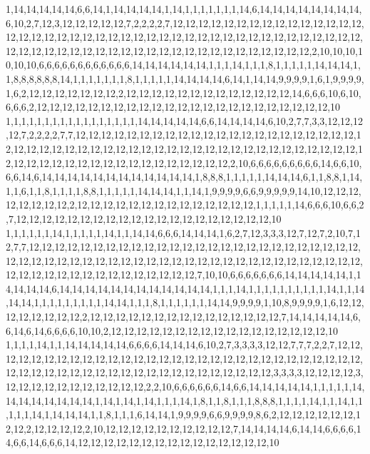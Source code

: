 1,14,14,14,14,14,6,6,14,1,14,14,14,14,1,14,1,1,1,1,1,1,1,14,6,14,14,14,14,14,14,14,14,6,10,2,7,12,3,12,12,12,12,12,7,2,2,2,2,7,12,12,12,12,12,12,12,12,12,12,12,12,12,12,12,12,12,12,12,12,12,12,12,12,12,12,12,12,12,12,12,12,12,12,12,12,12,12,12,12,12,12,12,12,12,12,12,12,12,12,12,12,12,12,12,12,12,12,12,12,12,12,12,12,12,12,12,2,10,10,10,10,10,10,6,6,6,6,6,6,6,6,6,6,6,6,14,14,14,14,14,14,1,1,1,14,1,1,1,8,1,1,1,1,1,14,14,14,1,1,8,8,8,8,8,8,14,1,1,1,1,1,1,1,8,1,1,1,1,1,14,14,14,14,6,14,1,14,14,9,9,9,9,1,6,1,9,9,9,9,1,6,2,12,12,12,12,12,12,12,2,12,12,12,12,12,12,12,12,12,12,12,12,12,14,6,6,6,10,6,10,6,6,6,2,12,12,12,12,12,12,12,12,12,12,12,12,12,12,12,12,12,12,12,12,12,12,12,10
1,1,1,1,1,1,1,1,1,1,1,1,1,1,1,1,1,14,14,14,14,14,6,6,14,14,14,14,6,10,2,7,7,3,3,12,12,12,12,7,2,2,2,2,7,7,12,12,12,12,12,12,12,12,12,12,12,12,12,12,12,12,12,12,12,12,12,12,12,12,12,12,12,12,12,12,12,12,12,12,12,12,12,12,12,12,12,12,12,12,12,12,12,12,12,12,12,12,12,12,12,12,12,12,12,12,12,12,12,12,12,12,12,12,2,10,6,6,6,6,6,6,6,6,6,14,6,6,10,6,6,14,6,14,14,14,14,14,14,14,14,14,14,14,14,1,8,8,8,1,1,1,1,1,14,14,14,6,1,1,8,8,1,14,1,1,6,1,1,8,1,1,1,1,8,8,1,1,1,1,1,14,14,14,1,1,14,1,9,9,9,9,6,6,9,9,9,9,9,14,10,12,12,12,12,12,12,12,12,2,12,12,12,12,12,12,12,12,12,12,12,12,12,12,1,1,1,1,1,14,6,6,6,10,6,6,2,7,12,12,12,12,12,12,12,12,12,12,12,12,12,12,12,12,12,12,12,12,10
1,1,1,1,1,1,14,1,1,1,1,1,14,1,1,14,14,6,6,6,14,14,14,1,6,2,7,12,3,3,3,12,7,12,7,2,10,7,12,7,7,12,12,12,12,12,12,12,12,12,12,12,12,12,12,12,12,12,12,12,12,12,12,12,12,12,12,12,12,12,12,12,12,12,12,12,12,12,12,12,12,12,12,12,12,12,12,12,12,12,12,12,12,12,12,12,12,12,12,12,12,12,12,12,12,12,12,12,12,12,7,10,10,6,6,6,6,6,6,6,14,14,14,14,14,1,14,14,14,14,6,14,14,14,14,14,14,14,14,14,14,14,14,1,1,1,14,1,1,1,1,1,1,1,1,1,1,14,1,1,14,14,14,1,1,1,1,1,1,1,1,1,14,14,1,1,1,8,1,1,1,1,1,1,14,14,9,9,9,9,1,10,8,9,9,9,9,1,6,12,12,12,12,12,12,12,12,2,12,12,12,12,12,12,12,12,12,12,12,12,12,12,12,7,14,14,14,14,14,6,6,14,6,14,6,6,6,6,10,10,2,12,12,12,12,12,12,12,12,12,12,12,12,12,12,12,12,12,10
1,1,1,1,14,1,1,14,14,14,14,14,6,6,6,6,14,14,14,6,10,2,7,3,3,3,3,12,12,7,7,7,2,2,7,12,12,12,12,12,12,12,12,12,12,12,12,12,12,12,12,12,12,12,12,12,12,12,12,12,12,12,12,12,12,12,12,12,12,12,12,12,12,12,12,12,12,12,12,12,12,12,12,12,12,12,3,3,3,3,12,12,12,12,3,12,12,12,12,12,12,12,12,12,12,12,2,2,10,6,6,6,6,6,6,14,6,6,14,14,14,14,14,1,1,1,1,1,14,14,14,14,14,14,14,14,1,14,1,14,1,14,1,1,1,14,1,8,1,1,8,1,1,1,8,8,8,1,1,1,1,14,1,1,14,1,1,1,1,1,14,1,14,14,14,1,1,8,1,1,1,6,14,14,1,9,9,9,9,6,6,9,9,9,9,8,6,2,12,12,12,12,12,12,12,12,2,12,12,12,12,2,10,12,12,12,12,12,12,12,12,12,12,7,14,14,14,14,6,14,14,6,6,6,6,14,6,6,14,6,6,6,14,12,12,12,12,12,12,12,12,12,12,12,12,12,12,12,10
